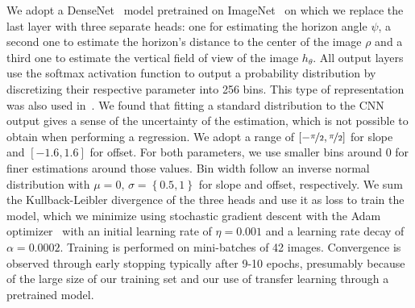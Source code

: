 We adopt a DenseNet~\cite{Huang2016} model pretrained on ImageNet~\cite{Russakovsky2015} on which we replace the last layer with three separate heads: one for estimating the horizon angle $\psi$, a second one to estimate the horizon's distance to the center of the image $\rho$ and a third one to estimate the vertical field of view of the image $h_{\theta}$.
All output layers use the softmax activation function to output a probability distribution by discretizing their respective parameter into 256 bins. This type of representation was also used in~\cite{Workman2016}. We found that fitting a standard distribution to the CNN output gives a sense of the uncertainty of the estimation, which is not possible to obtain when performing a regression. We adopt a range of $\left[ -\nicefrac{\pi}{2}, \nicefrac{\pi}{2} \right]$ for slope and $\left[ -1.6, 1.6\right]$ for offset. For both parameters, we use smaller bins around 0 for finer estimations around those values. Bin width follow an inverse normal distribution with $\mu=0,\, \sigma=\left\{ 0.5, 1 \right\}$ for slope and offset, respectively. We sum the Kullback-Leibler divergence of the three heads and use it as loss to train the model, which we minimize using stochastic gradient descent with the Adam optimizer~\cite{Kingma2015} with an initial learning rate of $\eta = 0.001$ and a learning rate decay of $ \alpha = 0.0002$. Training is performed on mini-batches of 42 images. Convergence is observed through early stopping typically after 9-10 epochs, presumably because of the large size of our training set and our use of transfer learning through a pretrained model.

